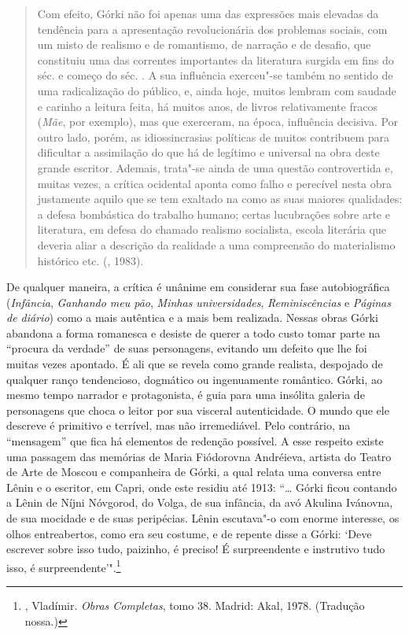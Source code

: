 \begin{quotation}
Com efeito, Górki não foi apenas uma das expressões mais elevadas
da tendência para a apresentação revolucionária dos problemas
sociais, com um misto de realismo e de romantismo, de narração e
de desafio, que constituiu uma das correntes importantes da
literatura surgida em fins do séc.  e começo do séc.
. A sua influência exerceu"-se também no sentido de
uma radicalização do público, e, ainda hoje, muitos lembram com
saudade e carinho a leitura feita, há muitos anos, de livros
relativamente fracos (\emph{Mãe}, por exemplo), mas que exerceram,
na época, influência decisiva. Por outro lado, porém, as
idiossincrasias políticas de muitos contribuem para dificultar a
assimilação do que há de legítimo e universal na obra deste grande
escritor. Ademais, trata"-se ainda de uma questão controvertida e,
muitas vezes, a crítica ocidental aponta como falho e perecível
nesta obra justamente aquilo que se tem exaltado na 
como as suas maiores qualidades: a defesa bombástica do trabalho
humano; certas lucubrações sobre arte e literatura, em defesa do
chamado realismo socialista, escola literária que deveria aliar a
descrição da realidade a uma compreensão do materialismo histórico etc. (, 1983).
\end{quotation}

De qualquer maneira, a crítica é unânime em considerar sua fase
autobiográfica (\emph{Infância}, \emph{Ganhando meu pão},
\emph{Minhas universidades}, \emph{Reminiscências} e \emph{Páginas
de diário}) como a mais autêntica e a mais bem realizada. Nessas
obras Górki abandona a forma romanesca e desiste de querer a todo
custo tomar parte na ``procura da verdade'' de suas personagens,
evitando um defeito que lhe foi muitas vezes apontado. É ali que
se revela como grande realista, despojado de qualquer ranço
tendencioso, dogmático ou ingenuamente romântico. Górki, ao mesmo
tempo narrador e protagonista, é guia para uma insólita galeria
de personagens que choca o leitor por sua visceral autenticidade.
O mundo que ele descreve é primitivo e terrível, mas não
irremediável. Pelo contrário, na ``mensagem'' que fica há
elementos de redenção possível. A esse respeito existe uma
passagem das memórias de Maria Fiódorovna Andréieva, artista do
Teatro de Arte de Moscou e companheira de Górki, a qual relata
uma conversa entre Lênin e o escritor, em Capri, onde este
residiu até 1913: ``\ldots{} Górki ficou contando a Lênin de
Níjni Nóvgorod, do Volga, de sua infância, da avó Akulina
Ivánovna, de sua mocidade e de suas peripécias. Lênin escutava"-o
com enorme interesse, os olhos entreabertos, como era seu costume,
e de repente disse a Górki: `Deve escrever sobre isso tudo,
paizinho, é preciso! É surpreendente e instrutivo tudo isso, é
surpreendente'".\footnote{, Vladímir. \emph{Obras
Completas}, tomo 38. Madrid: Akal, 1978. (Tradução nossa.)}

